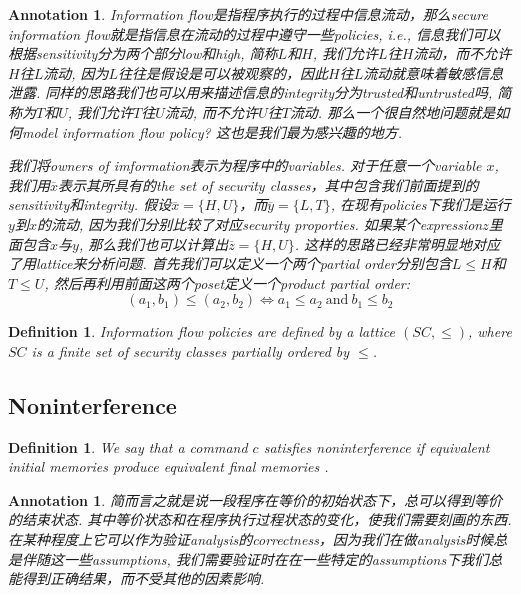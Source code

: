 \documentclass{article}
\newtheorem{definition}[theorem]{Definition}
\newtheorem{annotation}[theorem]{Annotation}
\begin{document}
\begin{annotation}
\rm Information flow是指程序执行的过程中信息流动，那么secure information flow就是指信息在流动的过程中遵守一些policies, i.e., 信息我们可以根据sensitivity分为两个部分low和high, 简称$L$和$H$, 我们允许$L$往$H$流动，而不允许$H$往$L$流动, 因为$L$往往是假设是可以被观察的，因此$H$往$L$流动就意味着敏感信息泄露. 同样的思路我们也可以用来描述信息的integrity分为trusted和untrusted吗, 简称为$T$和$U$, 我们允许$T$往$U$流动, 而不允许$U$往$T$流动. 那么一个很自然地问题就是如何model information flow policy? 这也是我们最为感兴趣的地方. 

我们将owners of imformation表示为程序中的variables. 对于任意一个variable $x$, 我们用$\overline{x}$表示其所具有的the set of security classes，其中包含我们前面提到的sensitivity和integrity. 假设$\overline{x} = \{H,U\}$，而$\overline{y} = \{L, T\}$, 在现有policies下我们是运行$y$到$x$的流动, 因为我们分别比较了对应security proporties. 如果某个expression$z$里面包含$x$与$y$, 那么我们也可以计算出$\overline{z} = \{H,U\}$. 这样的思路已经非常明显地对应了用lattice来分析问题. 首先我们可以定义一个两个partial order分别包含$L \leq H$和$T \leq U$, 然后再利用前面这两个poset定义一个product partial order:
\[
	(a_1, b_1) \leq (a_2, b_2) \iff a_1 \leq a_2 ~\text{and}~b_1 \leq b_2 
\]
\end{annotation}

\begin{definition}
\rm Information flow policies are defined by a lattice $(SC, \leq)$, where $SC$ is a finite set of security classes partially ordered by $\leq$.
\end{definition}


\subsection{Noninterference}

\begin{definition}
\rm We say that a command $c$ satisfies noninterference if equivalent initial memories produce equivalent final memories \cite{noninterference}.
\end{definition}

\begin{annotation}
\rm 简而言之就是说一段程序在等价的初始状态下，总可以得到等价的结束状态. 其中等价状态和在程序执行过程状态的变化，使我们需要刻画的东西. 在某种程度上它可以作为验证analysis的correctness，因为我们在做analysis时候总是伴随这一些assumptions, 我们需要验证时在在一些特定的assumptions下我们总能得到正确结果，而不受其他的因素影响. 
\end{annotation}
\end{document}
